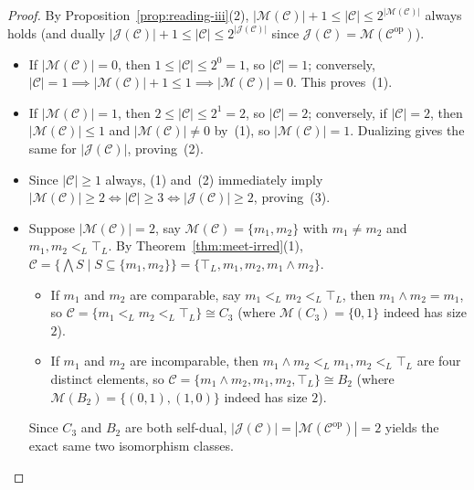 \documentclass[11pt,a4paper]{article}
\theoremstyle{definition}
\theoremstyle{remark}
\begin{document}
\begin{proof}
By Proposition~\ref{prop:reading-iii}(2), $|\mathcal{M}(\mathcal{C})| + 1 \le |\mathcal{C}| \le 2^{|\mathcal{M}(\mathcal{C})|}$ always holds (and dually $|\mathcal{J}(\mathcal{C})| + 1 \le |\mathcal{C}| \le 2^{|\mathcal{J}(\mathcal{C})|}$ since $\mathcal{J}(\mathcal{C}) = \mathcal{M}(\mathcal{C}^{\mathrm{op}})$).
\begin{itemize}
\item If $|\mathcal{M}(\mathcal{C})| = 0$, then $1 \le |\mathcal{C}| \le 2^0 = 1$, so $|\mathcal{C}| = 1$; conversely, $|\mathcal{C}| = 1 \implies |\mathcal{M}(\mathcal{C})| + 1 \le 1 \implies |\mathcal{M}(\mathcal{C})| = 0$. This proves~(1).
\item If $|\mathcal{M}(\mathcal{C})| = 1$, then $2 \le |\mathcal{C}| \le 2^1 = 2$, so $|\mathcal{C}| = 2$; conversely, if $|\mathcal{C}| = 2$, then $|\mathcal{M}(\mathcal{C})| \le 1$ and $|\mathcal{M}(\mathcal{C})| \neq 0$ by~(1), so $|\mathcal{M}(\mathcal{C})| = 1$. Dualizing gives the same for $|\mathcal{J}(\mathcal{C})|$, proving~(2).
\item Since $|\mathcal{C}| \ge 1$ always, (1) and~(2) immediately imply $|\mathcal{M}(\mathcal{C})| \ge 2 \iff |\mathcal{C}| \ge 3 \iff |\mathcal{J}(\mathcal{C})| \ge 2$, proving~(3).
\item Suppose $|\mathcal{M}(\mathcal{C})| = 2$, say $\mathcal{M}(\mathcal{C}) = \{m_1, m_2\}$ with $m_1 \neq m_2$ and $m_1, m_2 <_L \top_L$. By Theorem~\ref{thm:meet-irred}(1), $\mathcal{C} = \{ \bigwedge S \mid S \subseteq \{m_1, m_2\} \} = \{\top_L, m_1, m_2, m_1 \wedge m_2\}$.
  \begin{itemize}
  \item If $m_1$ and $m_2$ are comparable, say $m_1 <_L m_2 <_L \top_L$, then $m_1 \wedge m_2 = m_1$, so $\mathcal{C} = \{m_1 <_L m_2 <_L \top_L\} \cong C_3$ (where $\mathcal{M}(C_3) = \{0, 1\}$ indeed has size $2$).
  \item If $m_1$ and $m_2$ are incomparable, then $m_1 \wedge m_2 <_L m_1, m_2 <_L \top_L$ are four distinct elements, so $\mathcal{C} = \{m_1 \wedge m_2, m_1, m_2, \top_L\} \cong B_2$ (where $\mathcal{M}(B_2) = \{(0,1), (1,0)\}$ indeed has size $2$).
  \end{itemize}
Since $C_3$ and $B_2$ are both self-dual, $|\mathcal{J}(\mathcal{C})| = |\mathcal{M}(\mathcal{C}^{\mathrm{op}})| = 2$ yields the exact same two isomorphism classes. \qedhere
\end{itemize}
\end{proof}
\end{document}
